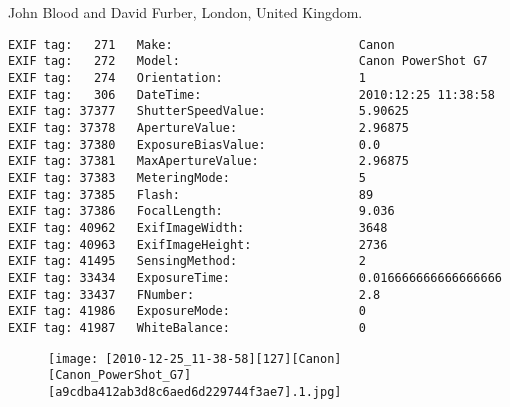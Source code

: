 \section{\protect{}}
\noindent John Blood and David Furber, London, United Kingdom.
\noindent
\begin{lstlisting}
EXIF tag:   271   Make:                          Canon
EXIF tag:   272   Model:                         Canon PowerShot G7
EXIF tag:   274   Orientation:                   1
EXIF tag:   306   DateTime:                      2010:12:25 11:38:58
EXIF tag: 37377   ShutterSpeedValue:             5.90625
EXIF tag: 37378   ApertureValue:                 2.96875
EXIF tag: 37380   ExposureBiasValue:             0.0
EXIF tag: 37381   MaxApertureValue:              2.96875
EXIF tag: 37383   MeteringMode:                  5
EXIF tag: 37385   Flash:                         89
EXIF tag: 37386   FocalLength:                   9.036
EXIF tag: 40962   ExifImageWidth:                3648
EXIF tag: 40963   ExifImageHeight:               2736
EXIF tag: 41495   SensingMethod:                 2
EXIF tag: 33434   ExposureTime:                  0.016666666666666666
EXIF tag: 33437   FNumber:                       2.8
EXIF tag: 41986   ExposureMode:                  0
EXIF tag: 41987   WhiteBalance:                  0

\end{lstlisting}
\clearpage
\begin{figure}
\raggedleft
\texttt{[image: [2010-12-25\_11-38-58][127][Canon][Canon\_PowerShot\_G7][a9cdba412ab3d8c6aed6d229744f3ae7].1.jpg]}
\end{figure}


\clearpage
